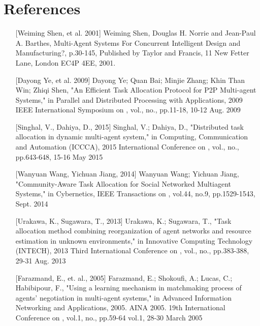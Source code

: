 \documentclass[12pt,letterpaper,onecolumn]{article}
\begin{document}
	\section{References}
	\begin{enumerate}
		\item[][Weiming Shen, et al. 2001] Weiming Shen, Douglas H. Norrie and Jean-Paul A. Barthes, Multi-Agent Systems For Concurrent Intelligent Design and Manufacturing?, p.30-145, Published by Taylor and Francis, 11 New Fetter Lane, London EC4P 4EE,  2001.
		\item[][Dayong Ye, et al. 2009] Dayong Ye; Quan Bai; Minjie Zhang; Khin Than Win; Zhiqi Shen, "An Efficient Task Allocation Protocol for P2P Multi-agent Systems," in Parallel and Distributed Processing with Applications, 2009 IEEE International Symposium on , vol., no., pp.11-18, 10-12 Aug. 2009
		\item[][Singhal, V., Dahiya, D., 2015] Singhal, V.; Dahiya, D., "Distributed task allocation in dynamic multi-agent system," in Computing, Communication and Automation (ICCCA), 2015 International Conference on , vol., no., pp.643-648, 15-16 May 2015
		\item[] [Wanyuan Wang, Yichuan Jiang, 2014] Wanyuan Wang; Yichuan Jiang, "Community-Aware Task Allocation for Social Networked Multiagent Systems," in Cybernetics, IEEE Transactions on , vol.44, no.9, pp.1529-1543, Sept. 2014
		\item[] [Urakawa, K., Sugawara, T., 2013] Urakawa, K.; Sugawara, T., "Task allocation method combining reorganization of agent networks and resource estimation in unknown environments," in Innovative Computing Technology (INTECH), 2013 Third International Conference on , vol., no., pp.383-388, 29-31 Aug. 2013
		\item[] [Farazmand, E., et. al., 2005] Farazmand, E.; Shokoufi, A.; Lucas, C.; Habibipour, F., "Using a learning mechanism in matchmaking process of agents' negotiation in multi-agent systems," in Advanced Information Networking and Applications, 2005. AINA 2005. 19th International Conference on , vol.1, no., pp.59-64 vol.1, 28-30 March 2005
	\end{enumerate}
\end{document}
